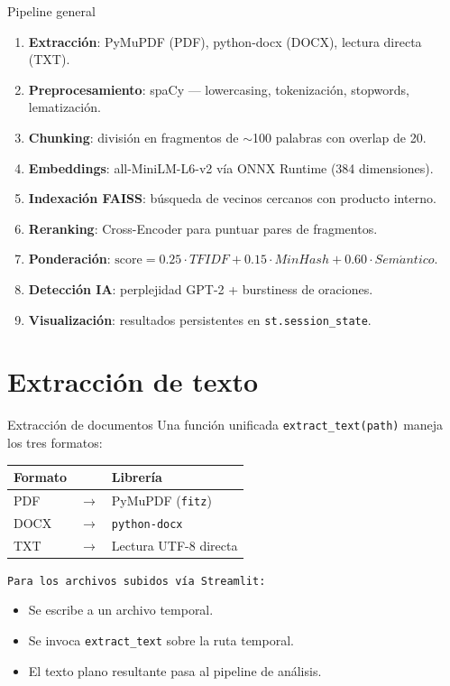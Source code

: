 \documentclass[aspectratio=169]{beamer}
\begin{document}
\begin{frame}{Pipeline general}
  \centering
  \footnotesize
  \begin{enumerate}
    \item \textbf{Extracción}: PyMuPDF (PDF), python-docx (DOCX), lectura directa (TXT).
    \item \textbf{Preprocesamiento}: spaCy --- lowercasing, tokenización, stopwords, lematización.
    \item \textbf{Chunking}: división en fragmentos de $\sim$100 palabras con overlap de 20.
    \item \textbf{Embeddings}: all-MiniLM-L6-v2 vía ONNX Runtime (384 dimensiones).
    \item \textbf{Indexación FAISS}: búsqueda de vecinos cercanos con producto interno.
    \item \textbf{Reranking}: Cross-Encoder para puntuar pares de fragmentos.
    \item \textbf{Ponderación}:
          $\text{score} = 0.25 \cdot TFIDF + 0.15 \cdot MinHash + 0.60 \cdot Sem\acute{a}ntico$.
    \item \textbf{Detección IA}: perplejidad GPT-2 + burstiness de oraciones.
    \item \textbf{Visualización}: resultados persistentes en \texttt{st.session\_state}.
  \end{enumerate}
\end{frame}

\section{Extracción de texto}

\begin{frame}{Extracción de documentos}
  Una función unificada \texttt{extract\_text(path)} maneja los tres formatos:
  \vspace{0.5em}
  \begin{center}
    \begin{tabular}{lcl}
      \textbf{Formato} & & \textbf{Librería} \\
      \hline
      PDF   & $\rightarrow$ & PyMuPDF (\texttt{fitz}) \\
      DOCX  & $\rightarrow$ & \texttt{python-docx} \\
      TXT   & $\rightarrow$ & Lectura UTF-8 directa \\
    \end{tabular}
  \end{center}
  \vspace{1em}
  \texttt{Para los archivos subidos vía Streamlit:}
  \begin{itemize}
    \item Se escribe a un archivo temporal.
    \item Se invoca \texttt{extract\_text} sobre la ruta temporal.
    \item El texto plano resultante pasa al pipeline de análisis.
  \end{itemize}
\end{frame}
\end{document}

